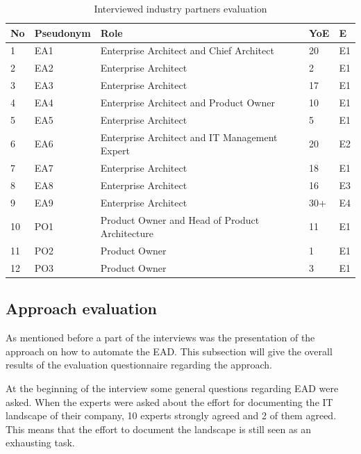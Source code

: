 \begin{table}[htpb]
  \caption[Interviewed industry partners evaluation]{Interviewed industry partners evaluation}\label{tab:interviewedindustrypartners}
  \centering
  \begin{tabular}{l l l l l}
    \toprule
      No & Pseudonym & Role & YoE & E\\
    \midrule
      1 & EA1 & Enterprise Architect and Chief Architect & 20 & E1\\ %
      2 & EA2 & Enterprise Architect & 2 & E1\\ %
      3 & EA3 & Enterprise Architect & 17 & E1\\ %
      4 & EA4 & Enterprise Architect and Product Owner & 10 & E1\\ %
      5 & EA5 & Enterprise Architect & 5 & E1\\ %
      6 & EA6 & Enterprise Architect and IT Management Expert & 20 & E2\\ %
      7 & EA7 & Enterprise Architect & 18 & E1\\ %
      8 & EA8 & Enterprise Architect & 16 & E3\\ %
      9 & EA9 & Enterprise Architect & 30+ & E4\\ %
      10 & PO1 & Product Owner and Head of Product Architecture & 11 & E1\\ %
      11 & PO2 & Product Owner & 1 & E1\\ %
      12 & PO3 & Product Owner & 3 & E1\\ %
    \bottomrule
  \end{tabular}
\end{table}

\subsection{Approach evaluation}

As mentioned before a part of the interviews was the presentation of the approach on how to automate the EAD. This subsection will give the overall results of the evaluation questionnaire regarding the approach.

At the beginning of the interview some general questions regarding EAD were asked. When the experts were asked about the effort for documenting the IT landscape of their company, 10 experts strongly agreed and 2 of them agreed. This means that the effort to document the landscape is still seen as an exhausting task. 


